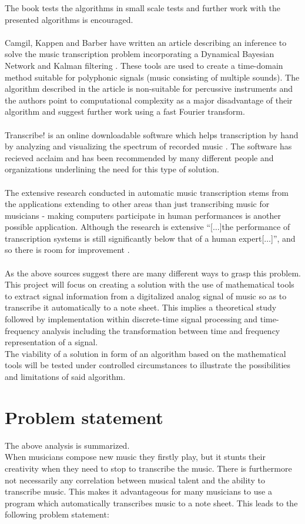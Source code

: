 The book tests the algorithms in small scale tests and further work with the presented algorithms is encouraged.
\\\\
Camgil, Kappen and Barber have written an article describing an inference to solve the music transcription problem incorporating a Dynamical Bayesian Network and Kalman filtering \cite{sol2}.
These tools are used to create a time-domain method suitable for polyphonic signals (music consisting of multiple sounds). 
The algorithm described in the article is non-suitable for percussive instruments and the authors point to computational complexity as a major disadvantage of their algorithm and suggest further work using a fast Fourier transform.
\\\\
Transcribe! is an online downloadable software which helps transcription by hand by analyzing and visualizing the spectrum of recorded music \cite{transcribe!}. The software has recieved acclaim and has been recommended by many different people and organizations underlining the need for this type of solution.
\\\\
The extensive research conducted in automatic music transcription stems from the applications extending to other areas than just transcribing music for musicians - making computers participate in human performances is another possible application. Although the research is extensive ``[$\ldots$]the performance of transcription systems is still significantly below that of a human expert[$\ldots$]'', and so there is room for improvement \cite{future}.
\\\\
As the above sources suggest there are many different ways to grasp this problem. This project will focus on creating a solution with the use of mathematical tools to extract signal information from a digitalized analog signal of music so as to transcribe it automatically to a note sheet.  
This implies a theoretical study followed by implementation within discrete-time signal processing and time-frequency analysis including the transformation between time and frequency representation of a signal.\\    
The viability of a solution in form of an algorithm based on the mathematical tools will be tested under controlled circumstances to illustrate the possibilities and limitations of said algorithm.

\section{Problem statement}
The above analysis is summarized.\\
When musicians compose new music they firstly play, but it stunts their creativity when they need to stop to transcribe the music. There is furthermore not necessarily any correlation between musical talent and the ability to transcribe music. This makes it advantageous for many musicians to use a program which automatically transcribes music to a note sheet. This leads to the following problem statement:

